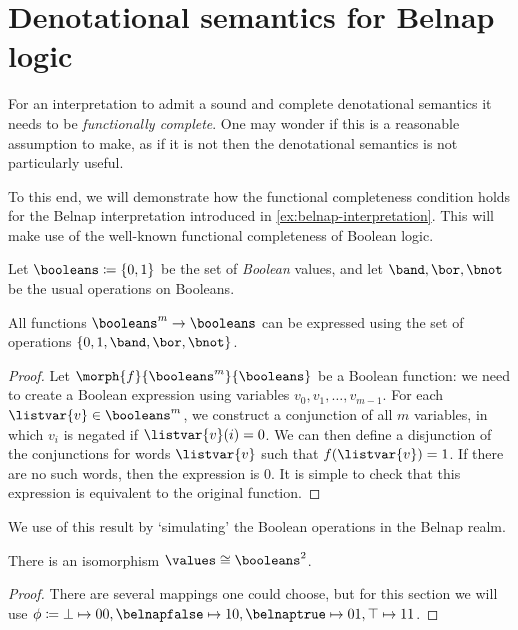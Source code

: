 \section{Denotational semantics for Belnap logic}\label{sec:denotational-belnap}

For an interpretation to admit a sound and complete denotational semantics it
needs to be \emph{functionally complete}.
One may wonder if this is a reasonable assumption to make, as if it is not then
the denotational semantics is not particularly useful.

To this end, we will demonstrate how the functional completeness condition holds
for the Belnap interpretation introduced in \cref{ex:belnap-interpretation}.
This will make use of the well-known functional completeness of Boolean logic.

\begin{definition}
    Let \(\booleans \coloneqq \{0, 1\}\) be the set of \emph{Boolean} values,
    and let \(\band,\bor,\bnot\) be the usual operations on Booleans.
\end{definition}

\begin{lemma}\label{lem:boolean-complete}
    All functions \(\booleans^{m} \to \booleans\) can be expressed using
    the set of operations \(\{0, 1, \band,\bor,\bnot\}\).
\end{lemma}
\begin{proof}
    Let \(\morph{f}{\booleans^{m}}{\booleans}\) be a Boolean function: we need
    to create a Boolean expression using variables \(v_0, v_1, \dots, v_{m-1}\).
    For each \(\listvar{v} \in \booleans^m\), we construct a conjunction of
    all \(m\) variables, in which \(v_i\) is negated if \(\listvar{v}(i) = 0\).
    We can then define a disjunction of the conjunctions for words
    \(\listvar{v}\) such that \(f(\listvar{v}) = 1\).
    If there are no such words, then the expression is \(0\).
    It is simple to check that this expression is equivalent to the original
    function.
\end{proof}

We use of this result by `simulating' the Boolean operations in the
Belnap realm.

\begin{lemma}
    There is an isomorphism \(\values \cong \booleans^2\).
\end{lemma}
\begin{proof}
    There are several mappings one could choose, but for this
    section we will use \(\phi \coloneqq
    \bot \mapsto 00, \belnapfalse \mapsto 10,
    \belnaptrue \mapsto 01, \top \mapsto 11
    \).
\end{proof}

